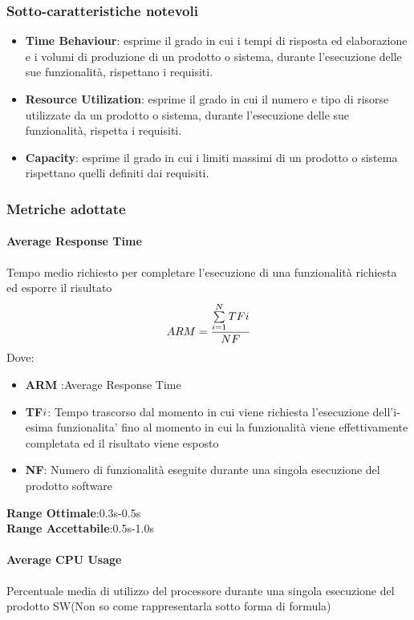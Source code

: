 \subsubsection{Sotto-caratteristiche notevoli}
\begin{itemize}
	\item{\textbf{Time Behaviour}}: esprime il grado in cui i tempi di risposta ed elaborazione e i volumi di produzione di un prodotto o sistema, durante l'esecuzione delle sue funzionalità, rispettano i requisiti.
	\item{\textbf{Resource Utilization}}: esprime il grado in cui il numero e tipo di risorse utilizzate da un prodotto o sistema, durante l'esecuzione delle sue funzionalità, rispetta i requisiti.
	\item{\textbf{Capacity}}: esprime il grado in cui i limiti massimi di un prodotto o sistema rispettano quelli definiti dai requisiti.
\end{itemize}
\subsubsection{Metriche adottate}
\paragraph{Average Response Time}
\begin{flushleft}
Tempo medio richiesto per completare l'esecuzione di una funzionalità richiesta ed esporre il risultato
$$ARM=\frac{\sum\limits_{i=1}^N TF{\small{i}}}{NF}$$
Dove:
\begin{itemize}
\item{\textbf{ARM}} :Average Response Time
\item{\textbf{TF${\small{i}}$}}: Tempo trascorso dal momento in cui viene richiesta l'esecuzione dell'i-esima funzionalita' fino al momento in cui la funzionalità viene effettivamente completata ed il risultato viene esposto
\item{\textbf{NF}}: Numero di funzionalità eseguite durante una singola esecuzione del prodotto software
\end{itemize}
\textbf{Range Ottimale}:0.3s-0.5s \\
\textbf{Range Accettabile}:0.5s-1.0s
\end{flushleft}
\paragraph{Average CPU Usage}
\begin{flushleft}
Percentuale media di utilizzo del processore durante una singola esecuzione del prodotto SW(Non so come rappresentarla sotto forma di formula)
\end{flushleft}
